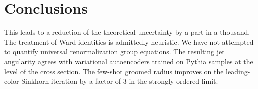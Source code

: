 \section{Conclusions}\label{sec:conclusions}

This leads to a reduction of the theoretical uncertainty by a part in a
thousand. The treatment of Ward identities is admittedly heuristic. We
have not attempted to quantify universal renormalization group
equations. The resulting jet angularity agrees with variational
autoencoders trained on Pythia samples at the level of the cross
section. The few-shot groomed radius improves on the leading-color
Sinkhorn iteration by a factor of 3 in the strongly ordered limit.

